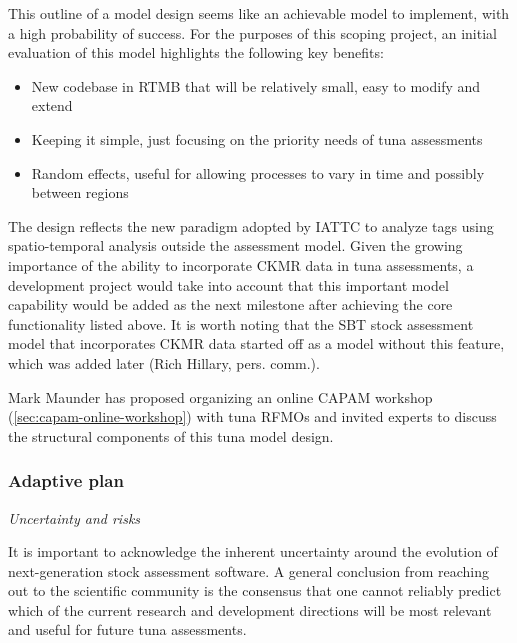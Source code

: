 \documentclass{SCreport}
\begin{document}
\vspace{2ex}

This outline of a model design seems like an achievable model to implement, with
a high probability of success. For the purposes of this scoping project, an
initial evaluation of this model highlights the following key benefits:

\begin{itemize}
  \item New codebase in RTMB that will be relatively small, easy to modify and
  extend\\[-4.5ex]
  \item Keeping it simple, just focusing on the priority needs of tuna
  assessments\\[-4.5ex]
  \item Random effects, useful for allowing processes to vary in time and
  possibly between regions
\end{itemize}

\vspace{2ex}

The design reflects the new paradigm adopted by IATTC to analyze tags using
spatio-temporal analysis outside the assessment model. Given the growing
importance of the ability to incorporate CKMR data in tuna assessments, a
development project would take into account that this important model capability
would be added as the next milestone after achieving the core functionality
listed above. It is worth noting that the SBT stock assessment model that
incorporates CKMR data started off as a model without this feature, which was
added later (Rich Hillary, pers. comm.).

Mark Maunder has proposed organizing an online CAPAM workshop
(\autoref{sec:capam-online-workshop}) with tuna RFMOs and invited experts to
discuss the structural components of this tuna model design.

\newpage

\subsubsection{Adaptive plan}

\textit{Uncertainty and risks}

It is important to acknowledge the inherent uncertainty around the evolution of
next-generation stock assessment software. A general conclusion from reaching
out to the scientific community is the consensus that one cannot reliably
predict which of the current research and development directions will be most
relevant and useful for future tuna assessments.
\end{document}
